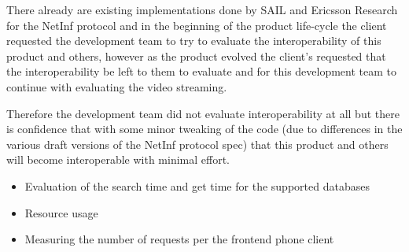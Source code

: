 There already are existing implementations done by SAIL and Ericsson Research for the NetInf protocol and in the beginning of the product life-cycle the client requested the development team to try to evaluate the interoperability of this product and others, however as the product evolved the client's requested that the interoperability be left to them to evaluate and for this development team to continue with evaluating the video streaming.

Therefore the development team did not evaluate interoperability at all but there is confidence that with some minor tweaking of the code (due to differences in the various draft versions of the NetInf protocol spec) that this product and others will become interoperable with minimal effort.


\begin{itemize}
\item Evaluation of the search time and get time for the supported databases
\item Resource usage
\item Measuring the number of requests per the frontend phone client
\end{itemize}